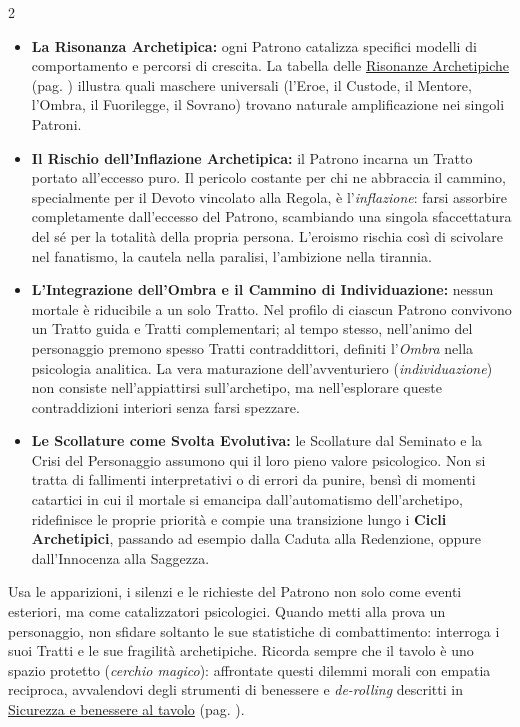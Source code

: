 \begin{multicols}{2}
\begin{itemize}[leftmargin=*] \setlength{\itemsep}{0pt}
\item \textbf{La Risonanza Archetipica:} ogni Patrono catalizza specifici modelli di comportamento e percorsi di crescita. La tabella delle \hyperlink{archetipi}{Risonanze Archetipiche} (pag. \pageref{archetipi}) illustra quali maschere universali (l'Eroe, il Custode, il Mentore, l'Ombra, il Fuorilegge, il Sovrano) trovano naturale amplificazione nei singoli Patroni.
\item \textbf{Il Rischio dell'Inflazione Archetipica:} il Patrono incarna un Tratto portato all'eccesso puro. Il pericolo costante per chi ne abbraccia il cammino, specialmente per il Devoto vincolato alla Regola, è l'\emph{inflazione}: farsi assorbire completamente dall'eccesso del Patrono, scambiando una singola sfaccettatura del sé per la totalità della propria persona. L'eroismo rischia così di scivolare nel fanatismo, la cautela nella paralisi, l'ambizione nella tirannia.
\item \textbf{L'Integrazione dell'Ombra e il Cammino di Individuazione:} nessun mortale è riducibile a un solo Tratto. Nel profilo di ciascun Patrono convivono un Tratto guida e Tratti complementari; al tempo stesso, nell'animo del personaggio premono spesso Tratti contraddittori, definiti l'\emph{Ombra} nella psicologia analitica. La vera maturazione dell'avventuriero (\emph{individuazione}) non consiste nell'appiattirsi sull'archetipo, ma nell'esplorare queste contraddizioni interiori senza farsi spezzare.
\item \textbf{Le Scollature come Svolta Evolutiva:} le Scollature dal Seminato e la Crisi del Personaggio assumono qui il loro pieno valore psicologico. Non si tratta di fallimenti interpretativi o di errori da punire, bensì di momenti catartici in cui il mortale si emancipa dall'automatismo dell'archetipo, ridefinisce le proprie priorità e compie una transizione lungo i \textbf{Cicli Archetipici}, passando ad esempio dalla Caduta alla Redenzione, oppure dall'Innocenza alla Saggezza.
\end{itemize}

\begin{narratore}
Usa le apparizioni, i silenzi e le richieste del Patrono non solo come eventi esteriori, ma come catalizzatori psicologici. Quando metti alla prova un personaggio, non sfidare soltanto le sue statistiche di combattimento: interroga i suoi Tratti e le sue fragilità archetipiche. Ricorda sempre che il tavolo è uno spazio protetto (\emph{cerchio magico}): affrontate questi dilemmi morali con empatia reciproca, avvalendovi degli strumenti di benessere e \emph{de-rolling} descritti in \hyperlink{sicurezzatavolo}{Sicurezza e benessere al tavolo} (pag. \pageref{sicurezzatavolo}).
\end{narratore}

\end{multicols}

